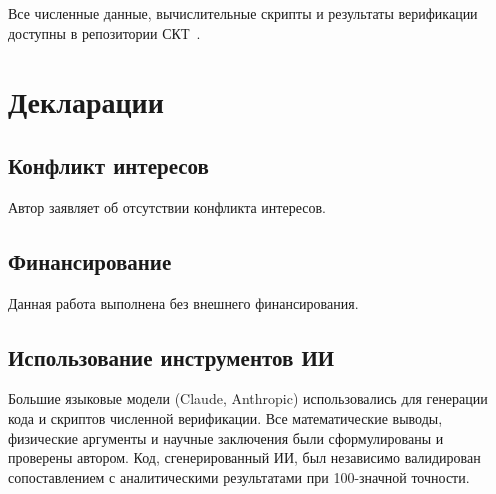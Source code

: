 \documentclass[12pt,a4paper]{article}
\theoremstyle{plain}
\theoremstyle{definition}
\theoremstyle{remark}
\begin{document}
Все численные данные, вычислительные скрипты и результаты
верификации доступны в репозитории
СКТ~\cite{Alfyorov:2026repo}.

\section*{Декларации}

\subsection*{Конфликт интересов}
Автор заявляет об отсутствии конфликта интересов.

\subsection*{Финансирование}
Данная работа выполнена без внешнего финансирования.

\subsection*{Использование инструментов ИИ}
Большие языковые модели (Claude, Anthropic) использовались для
генерации кода и скриптов численной верификации. Все математические
выводы, физические аргументы и научные заключения были
сформулированы и проверены автором. Код, сгенерированный ИИ, был
независимо валидирован сопоставлением с аналитическими результатами
при 100-значной точности.



\end{document}
